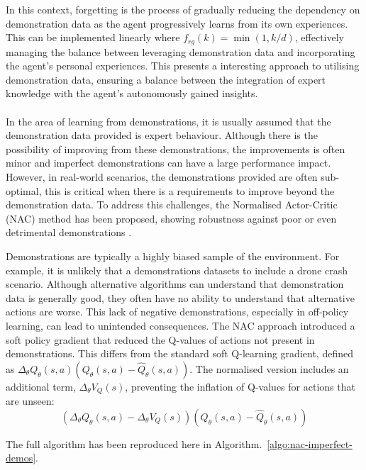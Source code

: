 In this context, forgetting is the process of gradually reducing the dependency on demonstration data as the agent progressively learns from its own experiences.
This can be implemented linearly where $f_{rg}(k) = \min(1, k/d)$, effectively managing the balance between leveraging demonstration data and incorporating the agent's personal experiences.
This presents a interesting approach to utilising demonstration data, ensuring a balance between the integration of expert knowledge with the agent's autonomously gained insights. \\\\

In the area of learning from demonstrations, it is usually assumed that the demonstration data provided is expert behaviour.
Although there is the possibility of improving from these demonstrations, the improvements is often minor and imperfect demonstrations can have a large performance impact.
However, in real-world scenarios, the demonstrations provided are often sub-optimal, this is critical when there is a requirements to improve beyond the demonstration data.
To address this challenges, the Normalised Actor-Critic (NAC) method has been proposed, showing robustness against poor or even detrimental demonstrations \cite{fyp14-rl-imperfect-demos}.

Demonstrations are typically a highly biased sample of the environment.
For example, it is unlikely that a demonstrations datasets to include a drone crash scenario.
Although alternative algorithms can understand that demonstration data is generally good, they often have no ability to understand that alternative actions are worse.
This lack of negative demonstrations, especially in off-policy learning, can lead to unintended consequences.
The NAC approach introduced a soft policy gradient that reduced the Q-values of actions not present in demonstrations.
This differs from the standard soft Q-learning gradient, defined as $ \Delta_{\theta} Q_{\theta}(s, a)(Q_{\theta}(s, a) - \hat{Q}_{\theta}(s, a)) $.
The normalised version includes an additional term, $\Delta_{\theta} V_Q(s)$, preventing the inflation of Q-values for actions that are unseen:
\[ (\Delta_{\theta} Q_{\theta}(s, a) - \Delta_{\theta} V_Q(s))(Q_{\theta}(s, a) - \hat{Q}_{\theta}(s, a))\]

The full algorithm has been reproduced here in Algorithm.~\ref{algo:nac-imperfect-demos}.

